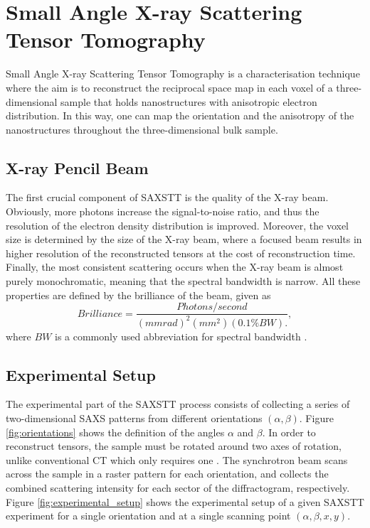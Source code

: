\chapter{Small Angle X-ray Scattering Tensor Tomography}
\label{chap:SAXSTT}

Small Angle X-ray Scattering Tensor Tomography is a characterisation technique where the aim is to reconstruct the reciprocal space map in each voxel of a three-dimensional sample
that holds nanostructures with anisotropic electron distribution.
In this way, one can map the orientation and the anisotropy of the nanostructures throughout the three-dimensional bulk sample.

\section{X-ray Pencil Beam} %
The first crucial component of SAXSTT is the quality of the X-ray beam.
Obviously, more photons increase the signal-to-noise ratio, and thus the resolution of the electron density distribution is improved.
Moreover, the voxel size is determined by the size of the X-ray beam, where a focused beam results in higher resolution of the reconstructed tensors at the cost of reconstruction time.
Finally, the most consistent scattering occurs when the X-ray beam is almost purely monochromatic, meaning that the spectral bandwidth is narrow.
All these properties are defined by the brilliance of the beam, given as
\begin{equation}
    Brilliance = \frac{Photons/second}{\left( mmrad \right)^{2} \left( mm^{2} \right) \left( 0.1\% BW \right).},
\end{equation}
where $BW$ is a commonly used abbreviation for spectral bandwidth \cite{mcmorrow2011elements}.

\section{Experimental Setup}
The experimental part of the SAXSTT process consists of collecting a series of two-dimensional SAXS patterns from different orientations $\left(\alpha,\beta\right)$.
Figure \ref{fig:orientations} shows the definition of the angles $\alpha$ and $\beta$. %
In order to reconstruct tensors, the sample must be rotated around two axes of rotation, unlike conventional CT which only requires one \cite{liebi2018small}.
The synchrotron beam scans across the sample in a raster pattern for each orientation, and collects the combined scattering intensity for each sector of the diffractogram, respectively.
Figure \ref{fig:experimental_setup} shows the experimental setup of a given SAXSTT experiment for a single orientation and at a single scanning point $(\alpha, \beta,x,y)$.

